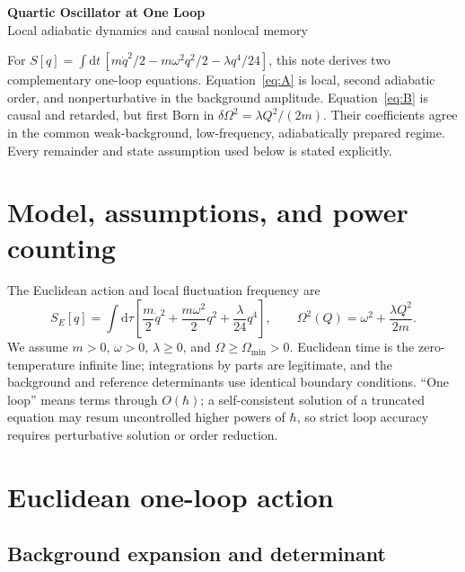 \documentclass[9pt]{extarticle}
\newcommand{\dd}{\mathrm d}
\newcommand{\Om}{\Omega}
\begin{document}
\begin{center}
{\color{Navy}\LARGE\bfseries Quartic Oscillator at One Loop}\\[-1pt]
{\large\color{Teal}Local adiabatic dynamics and causal nonlocal memory}\\[2pt]
\end{center}
\vspace{-2pt}

\begin{summarybox}
For
$S[q]=\int\dd t\,[m\dot q^2/2-m\omega^2q^2/2-\lambda q^4/24]$,
this note derives two complementary one-loop equations.  Equation~\eqref{eq:A} is local, second adiabatic order, and nonperturbative in the background amplitude.  Equation~\eqref{eq:B} is causal and retarded, but first Born in $\delta\Om^2=\lambda Q^2/(2m)$.  Their coefficients agree in the common weak-background, low-frequency, adiabatically prepared regime.  Every remainder and state assumption used below is stated explicitly.
\end{summarybox}

\section{Model, assumptions, and power counting}

The Euclidean action and local fluctuation frequency are
\begin{equation}
S_E[q]=\int\dd\tau\left[\frac m2\dot q^2+\frac{m\omega^2}{2}q^2+\frac\lambda{24}q^4\right],
\qquad
\Om^2(Q)=\omega^2+\frac{\lambda Q^2}{2m}.
\label{eq:model}
\end{equation}
We assume $m>0$, $\omega>0$, $\lambda\ge0$, and $\Om\ge\Om_{\min}>0$.  Euclidean time is the zero-temperature infinite line; integrations by parts are legitimate, and the background and reference determinants use identical boundary conditions.  ``One loop'' means terms through $O(\hbar)$; a self-consistent solution of a truncated equation may resum uncontrolled higher powers of $\hbar$, so strict loop accuracy requires perturbative solution or order reduction.

\section{Euclidean one-loop action}

\subsection{Background expansion and determinant}
\end{document}
